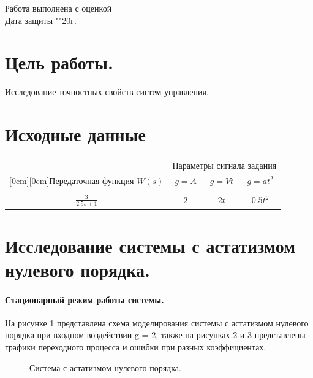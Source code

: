 \documentclass[a4paper, 11pt]{article}
\begin{document}
\begin{titlepage}
		Работа выполнена с оценкой \hspace{0.5cm} \underline{\hspace{10cm}} \\ 
		\vspace{1cm}
		Дата защиты "\underline{\hspace{0.4cm}}"\hspace{0.1cm}\underline{\hspace{1.5cm}}\hspace{0.1cm}20\underline{\hspace{0.4cm}}г.
		
	\end{titlepage}
\section*{Цель работы.}Исследование точностных свойств систем управления.

\section*{Исходные данные}

\begin{tabular}{cccc}
	& \multicolumn{3}{c}{Параметры сигнала задания} \\
	\raisebox{1.5ex}[0cm][0cm]{Передаточная функция $W(s)$}
	& $g = A$ & $g = Vt$ & $g = at^2$ \\
	\hline\\
	$\frac{3} {2.5s+1}$ & $2$ & $2t$ & $0.5t^2$ \\
\end{tabular}

\section*{Исследование системы с астатизмом нулевого порядка.}
\paragraph{Стационарный режим работы системы.} На рисунке 1 представлена схема моделирования системы с астатизмом нулевого порядка при входном воздействии g = 2, также на рисунках 2 и 3 представлены графики переходного процесса и ошибки при разных коэффициентах.

\begin{figure}[h]
    \caption{Система с астатизмом нулевого порядка.}
    \label{one}
\end{figure}
\end{document}
